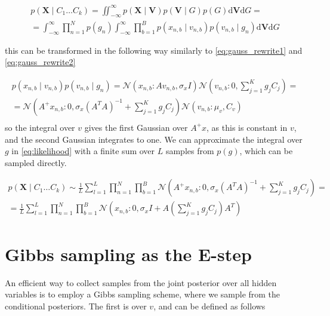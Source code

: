 \documentclass{paper}
\begin{document}
\begin{equation} \label{eq:likelihood}
\begin{split}
p(\mathbf{X} \mid C_1 \dots C_k) = \iint_{-\infty}^{\infty} p(\mathbf{X} \mid \mathbf{V}) p(\mathbf{V} \mid G) p(G) \mathrm{d}\mathbf{V}\mathrm{d}G =\\
= \int_{-\infty}^{\infty} \prod_{n=1}^N p(g_n) \int_{-\infty}^{\infty} \prod_{b=1}^B p(x_{n,b} \mid v_{n,b}) p(v_{n,b} \mid g_n) \mathrm{d}\mathbf{V}\mathrm{d}G
\end{split}
\end{equation}

this can be transformed in the following way similarly to \ref{eq:gauss_rewrite1} and \ref{eq:gauss_rewrite2}

\begin{equation}
\begin{split}
p(x_{n,b} \mid v_{n,b}) p(v_{n,b} \mid g_n) = \mathcal{N}(x_{n,b}:Av_{n,b},\sigma_x I) \mathcal{N}(v_{n,b}:0,\sum_{j=1}^K g_jC_j) = \\
= \mathcal{N}(A^{+}x_{n,b}:0,\sigma_x(A^TA)^{-1} + \sum_{j=1}^K g_jC_j) \mathcal{N}(v_{n,b}:\mu_v,C_v)\\
\end{split}
\end{equation}
%
so the integral over $v$ gives the first Gaussian over $A^{+}x$, as this is constant in $v$, and the second Gaussian integrates to one. We can approximate the integral over $g$ in \ref{eq:likelihood} with a finite sum over $L$ samples from $p(g)$, which can be sampled directly. 

\begin{equation}
\begin{split}
p(\mathbf{X} \mid C_1 \dots C_k) \sim \frac{1}{L} \sum_{l=1}^L \prod_{n=1}^N \prod_{b=1}^B \mathcal{N}(A^{+}x_{n,b}:0,\sigma_x(A^TA)^{-1} + \sum_{j=1}^K g_jC_j) = \\
= \frac{1}{L} \sum_{l=1}^L \prod_{n=1}^N \prod_{b=1}^B \mathcal{N} \left( x_{n,b}:0,\sigma_x I + A \left( \sum_{j=1}^K g_jC_j \right) A^T \right) 
\end{split}
\end{equation}

\section{Gibbs sampling as the E-step}

An efficient way to collect samples from the joint posterior over all hidden variables is to employ a Gibbs sampling scheme, where we sample from the conditional posteriors. The first is over $v$, and can be defined as follows
\end{document}
